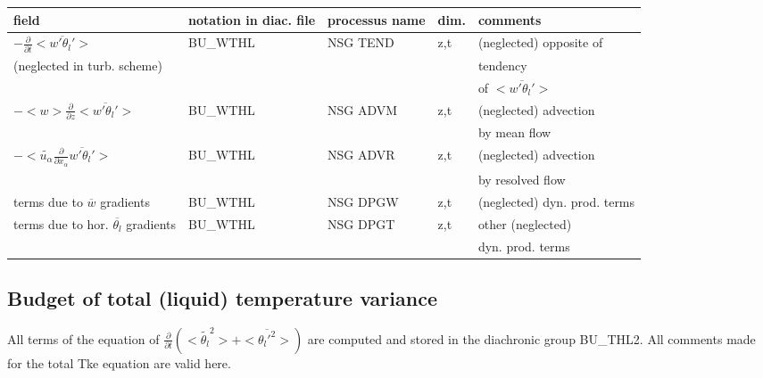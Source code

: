 \begin{center}
\begin{tabular}{||p{5cm}|>{\centering}p{2cm}|>{\centering}p{2.5cm}|>{\centering}p{0.5cm}|p{5.5cm }||}
\hline
\hline
field & notation in diac. file & processus name& dim.  & comments \\
\hline
\hline
$-\frac{\partial }{\partial t}<\overline{w'\theta_l'}>$ & BU\_WTHL & NSG TEND & z,t & (neglected) opposite of\\
(neglected in turb. scheme) & & & &tendency\\
 & & & &of $<\overline{w'\theta_l'}>$ \\
\hline
$-<w>\frac{\partial}{\partial z}<\overline{w'\theta_l'}>$  & BU\_WTHL & NSG ADVM & z,t & (neglected) advection \\
 & & & & by mean flow\\
\hline
$-<\tilde{u_\alpha}\frac{\partial}{\partial x_\alpha}\overline{w'\theta_l'}>$  & BU\_WTHL & NSG ADVR & z,t & (neglected) advection\\
 & & & & by resolved flow\\
\hline
terms due to $\overline{w}$ gradients  & BU\_WTHL & NSG DPGW & z,t & (neglected) dyn. prod. terms \\
\hline
terms due to hor. $\overline{\theta_l}$ gradients  & BU\_WTHL & NSG DPGT & z,t & other (neglected)\\
 & & & & dyn. prod. terms\\
\hline
\hline
\end{tabular}
\end{center}


\subsection{Budget of total (liquid) temperature variance}


All terms of the equation of $\frac{\partial}{\partial t} (<\tilde{\theta_l}^2> + <\overline{\theta_l'^2}>)$ are
computed and stored in the diachronic group BU\_THL2. 
All comments made for the total Tke equation are valid here.\\

